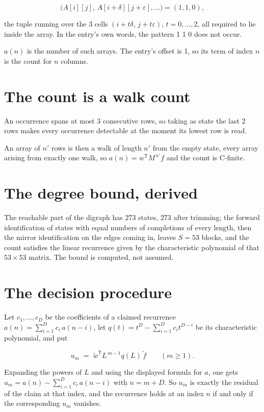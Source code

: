 \documentclass[11pt]{article}
\theoremstyle{definition}
\begin{document}
\[\bigl(A[i][j],\,A[i{+}\delta][j{+}\varepsilon],\dots\bigr) = (1, 1, 0),\]

the tuple running over the $3$ cells $(i+t\delta,\,j+t\varepsilon)$, $t = 0,\dots,2$, all required to lie inside the array. In the entry's own words, the pattern 1 1 0 does not occur.

$a(n)$ is the number of such arrays. The entry's offset is 1, so its term of index $n$ is the count for $n$ columns.

\section{The count is a walk count}

An occurrence spans at most $3$ consecutive rows, so taking as state the last $2$ rows makes every occurrence detectable at the moment its lowest row is read.

An array of $n'$ rows is then a walk of length $n'$ from the empty state, every array arising from exactly one walk, so $a(n) = w^{\mathsf T}M^{\,n'}f$ and the count is C-finite.

\section{The degree bound, derived}

The reachable part of the digraph has $273$ states, $273$ after trimming; the forward identification of states with equal numbers of completions of every length, then the mirror identification on the edges coming in, leaves $S = 53$ blocks, and the count satisfies the linear recurrence given by the characteristic polynomial of that $53\times53$ matrix. The bound is computed, not assumed.

\section{The decision procedure}

Let $c_1,\dots,c_D$ be the coefficients of a claimed recurrence $a(n) = \sum_{i=1}^{D} c_i\,a(n-i)$, let $q(t) = t^{D} - \sum_{i=1}^{D} c_i t^{D-i}$ be its characteristic polynomial, and put

\[u_m \;=\; \tilde w^{\mathsf T} L^{\,m-1} q(L)\,\tilde f \qquad (m \ge 1).\]

Expanding the powers of $L$ and using the displayed formula for $a$, one gets $u_m = a(n) - \sum_{i=1}^{D} c_i\,a(n-i)$ with $n = m + D$. So $u_m$ is exactly the residual of the claim at that index, and the recurrence holds at an index $n$ if and only if the corresponding $u_m$ vanishes.
\end{document}
